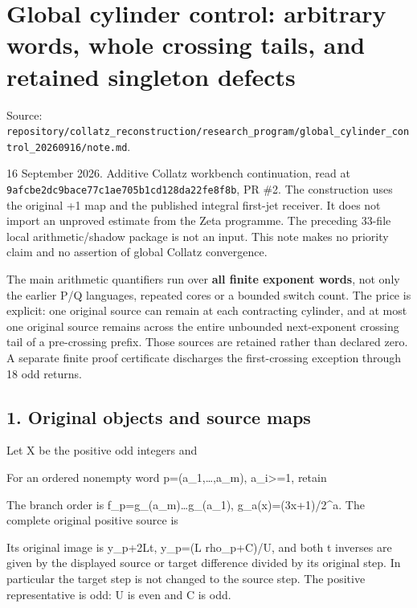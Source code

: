 \chapter{Global cylinder control: arbitrary words, whole crossing tails,
and retained singleton defects}
{\small\sffamily Source: \nolinkurl{repository/collatz_reconstruction/research_program/global_cylinder_control_20260916/note.md}.\par}


16 September 2026. Additive Collatz workbench continuation, read at
\nolinkurl{9afcbe2dc9bace77c1ae705b1cd128da22fe8f8b}, PR \#2. The
construction uses the original +1 map and the published integral
first-jet receiver. It does not import an unproved estimate from the
Zeta programme. The preceding 33-file local arithmetic/shadow package is
not an input. This note makes no priority claim and no assertion of
global Collatz convergence.

The main arithmetic quantifiers run over \textbf{all finite exponent
words}, not only the earlier P/Q languages, repeated cores or a bounded
switch count. The price is explicit: one original source can remain at
each contracting cylinder, and at most one original source remains
across the entire unbounded next-exponent crossing tail of a
pre-crossing prefix. Those sources are retained rather than declared
zero. A separate finite proof certificate discharges the first-crossing
exception through 18 odd returns.

\section{1. Original objects and source maps}

Let X be the positive odd integers and


For an ordered nonempty word p=(a\_1,\ldots,a\_m), a\_i\textgreater=1,
retain


The branch order is f\_p=g\_(a\_m)\ldots g\_(a\_1),
g\_a(x)=(3x+1)/2\^{}a. The complete original positive source is


Its original image is y\_p+2Lt, y\_p=(L rho\_p+C)/U, and both t inverses
are given by the displayed source or target difference divided by its
original step. In particular the target step is not changed to the
source step. The positive representative is odd: U is even and C is odd.

